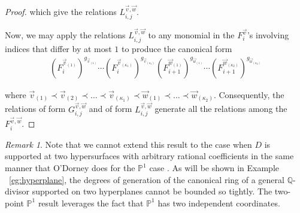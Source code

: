 \documentclass{amsart}
\theoremstyle{plain}
\theoremstyle{definition}
\theoremstyle{remark}
\newtheorem{rem}[thm]{Remark}
\numberwithin{equation}{section}
\newcommand\bq{{\mathbb Q}}
\newcommand\bp{{\mathbb P}}
\begin{document}
\begin{proof}
\noindent 
which give the relations $L_{i, j}^{\vec{v}, \vec{w}}$.

Now, we may apply the relations $L_{i, j}^{\vec{v}, \vec{w}}$
to any monomial in the $F_i^{\vec{v}}$'s involving
indices that differ by at most $1$ to produce the canonical form
\begin{align*}
	(F_i^{\vec{v}_{(1)}})^{g_{\vec{v}_{(1)}}} \cdots
	(F_i^{\vec{v}_{(\kappa_1)}})^{g_{\vec{v}_{(\kappa_1)}}}
	(F_{i + 1}^{\vec{w}_{(1)}})^{g_{\vec{w}_{(1)}}} \cdots
	(F_{i + 1}^{\vec{w}_{(\kappa_2)}})^{g_{\vec{w}_{(\kappa_2)}}}
\end{align*}

\noindent
where $\vec{v}_{(1)} \prec \vec{v}_{(2)} \prec \ldots \prec
\vec{v}_{(\kappa_1)} \prec \vec{w}_{(1)} \prec \ldots \prec
\vec{w}_{(\kappa_2)}$. Consequently, the relations of form
$G_{i, j}^{\vec{v}, \vec{w}}$ and of form $L_{i, j}^{\vec{v},
\vec{w}}$ generate all the relations among the $F_{i}^{\vec{v},
\vec{w}}$.
\end{proof}

\begin{rem}
\label{rem:proj-two-points}
Note that we cannot extend this result to the case when
$D$ is supported at two hypersurfaces with arbitrary rational
coefficients in the same manner that O'Dorney does for the
$\bp^1$ case \cite[Section 4]{dorney:canonical}. As will be shown
in Example ~\ref{eg:hyperplane}, the degrees of generation of the
canonical ring of a general $\bq$-divisor supported on two
hyperplanes cannot be bounded so tightly. The two-point
$\bp^1$ result leverages the fact that $\bp^1$ has two
independent coordinates.
\end{rem}


\restateeffective*
\end{document}

